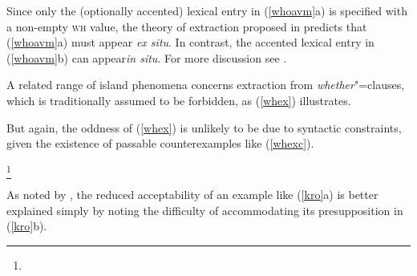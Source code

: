 \documentclass[output=paper
 	        ,biblatex
                ,babelshorthands
                ,newtxmath
                ,draftmode
                ,colorlinks, citecolor=brown
]{langscibook}
\begin{document}
\zl

Since only the (optionally accented) lexical entry in (\ref{whoavm}a) is specified with a non-empty
\textsc{wh} value, the theory of extraction proposed in \citet[Chapter~5]{ginzsag} predicts that (\ref{whoavm}a)
must appear \emph{ex situ}.  In contrast, the accented lexical entry in (\ref{whoavm}b) can
appear\emph{in situ}. For more discussion see \citet[261]{levhubook}.

A related range of island phenomena concerns extraction from \emph{whether}"=clauses, which is
traditionally assumed to be forbidden, as (\ref{whex}) illustrates.

\eal \label{whex}
\zl 

\noindent
But again, the oddness of (\ref{whex}) is unlikely to be due to syntactic constraints, given the
existence of passable counterexamples like (\ref{whexc}).

\eal \label{whexc}
\footnote{
}
\zl

As noted by \citet[28]{Kroch98a}, the reduced acceptability of an example like (\ref{kro}a) is better
explained simply by noting the difficulty of accommodating its presupposition in (\ref{kro}b).
\end{document}
